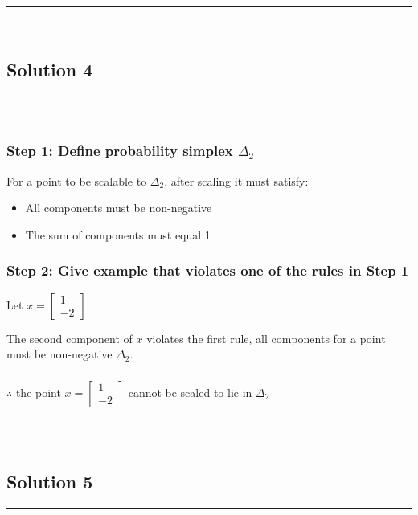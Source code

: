 \documentclass{article}
\begin{document}
\noindent\rule{\textwidth}{0.4pt}\\

\newpage

\subsection*{Solution 4}
\noindent\rule{\textwidth}{0.4pt}\\

\subsubsection*{Step 1: Define probability simplex $\Delta_2$ }
\parbox{\textwidth}{

For a point to be scalable to $\Delta_2$, after scaling it must satisfy:
\begin{itemize}
\item All components must be non-negative
\item The sum of components must equal 1
\end{itemize}
}

\subsubsection*{Step 2: Give example that violates one of the rules in Step 1}
\parbox{\textwidth}{
Let $x = \begin{bmatrix} 1 \\ -2 \end{bmatrix}$

The second component of $x$ violates the first rule, all components for a point must be non-negative $\Delta_2$.
}

\subsubsection*{\normalfont}{$\therefore$ the point $x = \begin{bmatrix} 1 \\ -2 \end{bmatrix}$ cannot be scaled to lie in $\Delta_{2}$}

\noindent\rule{\textwidth}{0.4pt}\\

\newpage

\subsection*{Solution 5}
\noindent\rule{\textwidth}{0.4pt}\\
\end{document}
